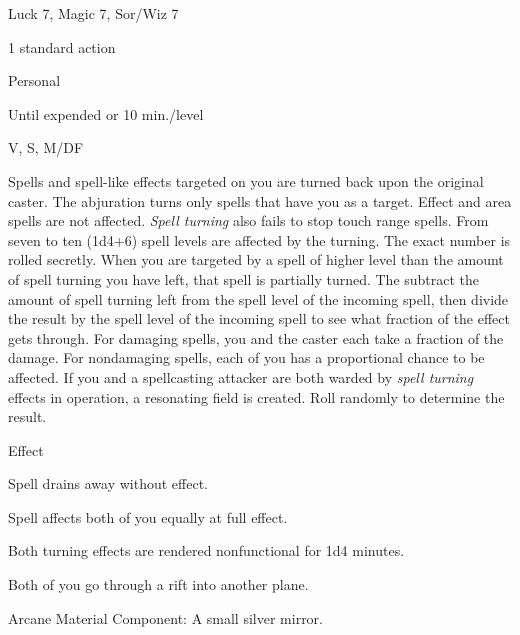 
\begin{description*}
\item[Level:] Luck 7, Magic 7, Sor/Wiz 7
\item[Casting Time:] 1 standard action
\item[Range:] Personal
\item[Duration:] Until expended or 10 min./level
\item[Components:] V, S, M/DF
\end{description*}

Spells and spell-like effects targeted on you are turned back upon the original
caster. The abjuration turns only spells that have you as a target. Effect and
area spells are not affected. \textit{Spell turning} also fails to stop touch range
spells.
From seven to ten (1d4+6) spell levels are affected by the turning. The exact number
is rolled secretly.
When you are targeted by a spell of higher level than the amount of spell turning
you have left, that spell is partially turned. The subtract the amount of spell
turning left from the spell level of the incoming spell, then divide the result
by the spell level of the incoming spell to see what fraction of the effect gets
through. For damaging spells, you and the caster each take a fraction of the damage.
For nondamaging spells, each of you has a proportional chance to be affected.
If you and a spellcasting attacker are both warded by \textit{spell turning} effects
in operation, a resonating field is created.
Roll randomly to determine the result.
\begin{description*}
\item[d\%] Effect
\item[01-70] Spell drains away without effect.
\item[71-80] Spell affects both of you equally at full effect.
\item[81-97] Both turning effects are rendered nonfunctional for 1d4 minutes.
\item[98-100] Both of you go through a rift into another plane.
\end{description*}
Arcane Material Component: A small silver mirror.